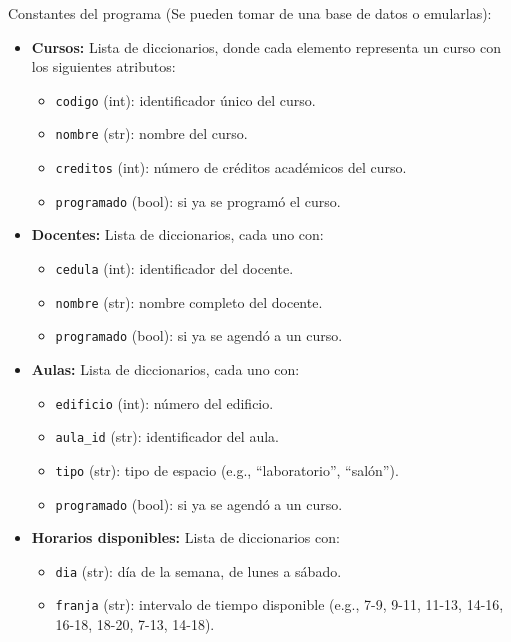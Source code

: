 \documentclass{article}
\begin{document}
Constantes del programa (Se pueden tomar de una base de datos o emularlas):
\begin{itemize}
  \item \textbf{Cursos:} Lista de diccionarios, donde cada elemento representa un curso con los siguientes atributos:
    \begin{itemize}
      \item \texttt{codigo} (int): identificador único del curso.
      \item \texttt{nombre} (str): nombre del curso.
      \item \texttt{creditos} (int): número de créditos académicos del curso.
      \item \texttt{programado} (bool): si ya se programó el curso.
    \end{itemize}
    
  \item \textbf{Docentes:} Lista de diccionarios, cada uno con:
    \begin{itemize}
      \item \texttt{cedula} (int): identificador del docente.
      \item \texttt{nombre} (str): nombre completo del docente.
      \item \texttt{programado} (bool): si ya se agendó a un curso.
    \end{itemize}

  \item \textbf{Aulas:} Lista de diccionarios, cada uno con:
    \begin{itemize}
      \item \texttt{edificio} (int): número del edificio.
      \item \texttt{aula\_id} (str): identificador del aula.
      \item \texttt{tipo} (str): tipo de espacio (e.g., ``laboratorio'', ``salón'').
      \item \texttt{programado} (bool): si ya se agendó a un curso.
    \end{itemize}

  \item \textbf{Horarios disponibles:} Lista de diccionarios con:
    \begin{itemize}
      \item \texttt{dia} (str): día de la semana, de lunes a sábado.
      \item \texttt{franja} (str): intervalo de tiempo disponible 
            (e.g., 7-9, 9-11, 11-13, 14-16, 16-18, 18-20, 7-13, 14-18).
    \end{itemize}
\end{itemize}
\end{document}

